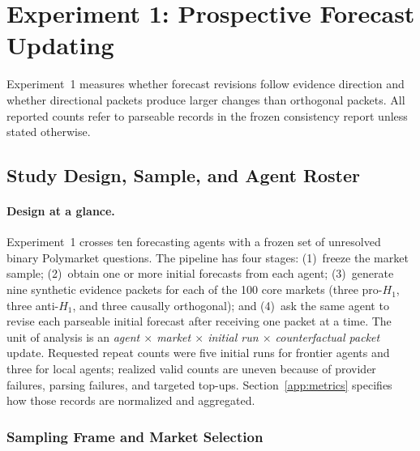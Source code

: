 
\section{Experiment 1: Prospective Forecast Updating}
\label{app:exp1}

Experiment~1 measures whether forecast revisions follow evidence direction and
whether directional packets produce larger changes than orthogonal packets.
All reported counts refer to parseable records in the frozen consistency report
unless stated otherwise.

\subsection{Study Design, Sample, and Agent Roster}
\label{app:exp1-sample}

\paragraph{Design at a glance.}
Experiment~1 crosses ten forecasting agents with a frozen set of unresolved binary
Polymarket questions.  The pipeline has four stages: (1)~freeze the market sample;
(2)~obtain one or more initial forecasts from each agent; (3)~generate nine synthetic
evidence packets for each of the 100 core markets (three pro-$H_1$, three
anti-$H_1$, and three causally orthogonal); and (4)~ask the same agent to revise each
parseable initial forecast after receiving one packet at a time.  The unit of analysis is an \emph{agent $\times$ market $\times$ initial run
$\times$ counterfactual packet} update.  Requested repeat
counts were five initial runs for frontier agents and three for local agents; realized
valid counts are uneven because of provider failures, parsing failures, and targeted
top-ups.  Section~\ref{app:metrics} specifies how those records are normalized and
aggregated.

\subsubsection{Sampling Frame and Market Selection}
\label{app:market-selection}


